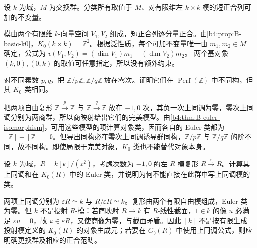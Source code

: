 \begin{exercise}\label{b4:ex:B-weighted-dimension}
	设 \(k\) 为域，\(M\) 为交换群。分类所有取值于 \(M\)、对有限维左 \(k\times k\)-模的短正合列可加的不变量。
\end{exercise}
\begin{solution}
	模由两个有限维 \(k\)-向量空间 \(V_1,V_2\) 组成，短正合列逐分量正合。由\cref{b4:prop:B-basic-k0}，\(K_0(k\times k)=\mathbb Z^2\)。根据泛性质，每个可加不变量唯一由 \(m_1,m_2\in M\) 确定，公式为 \(v(V_1,V_2)=(\dim V_1)m_1+(\dim V_2)m_2\)。 两个基对象 \((k,0),(0,k)\) 的取值可任意指定，所以没有额外约束。
\end{solution}

\begin{exercise}\label{b4:ex:B-euler-same-different}
	对不同素数 \(p,q\)，把 \(\mathbb Z/p\mathbb Z,\mathbb Z/q\mathbb Z\) 放在零次。证明它们在 \(\operatorname{Perf}(\mathbb Z)\) 中不同构，但其 \(K_0\) 类相同。
\end{exercise}
\begin{solution}
	把两项自由复形 \(\mathbb Z\xrightarrow{p}\mathbb Z\) 与 \(\mathbb Z\xrightarrow{q}\mathbb Z\) 放在 \(-1,0\) 次，其负一次上同调为零，零次上同调分别为两商群，所以商映射给出它们的完美模型。由\cref{b4:thm:B-euler-isomorphism}，可用这些模型的项计算对象类，因而各自的 Euler 类都为 \([\mathbb Z]-[\mathbb Z]=0\)。但导出同构必在零次上同调诱导群同构，\(\mathbb Z/p\mathbb Z\) 与 \(\mathbb Z/q\mathbb Z\) 的阶不同，故不同构。即使局限于完美对象，\(K_0\) 类也不能替代对象本身。
\end{solution}

\begin{exercise}\label{b4:ex:B-nonprojective-cohomology}
	设 \(k\) 为域，\(R=k[\varepsilon]/(\varepsilon^2)\)，考虑次数为 \(-1,0\) 的左 \(R\)-模复形 \(R\xrightarrow{\varepsilon}R\)。计算其上同调和在 \(K_0(R)\) 中的 Euler 类，并说明为何不能直接在此群中写上同调模的类。
\end{exercise}
\begin{solution}
	两项上同调分别为 \(\varepsilon R\simeq k\) 与 \(R/\varepsilon R\simeq k\)。复形由两个有限自由模组成，Euler 类为零。但 \(k\) 不是投射 \(R\)-模：若商映射 \(R\rightarrow k\) 有 \(R\)-线性截面，\(1\in k\) 的像 \(u\) 必满足 \(\varepsilon u=0\)，故 \(u\in\varepsilon R\)，又使商像为零，与截面矛盾。因此 \([k]\) 不是按有限生成投射模定义的 \(K_0(R)\) 的对象生成元；若要在 \(G_0(R)\) 中使用上同调公式，则应明确更换群及相应的正合范畴。
\end{solution}

